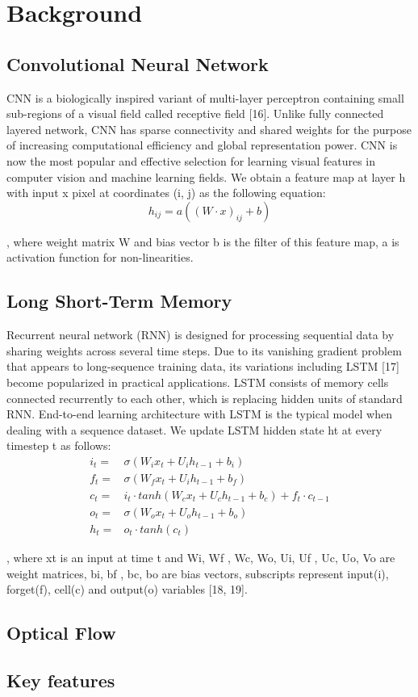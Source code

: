 \section{Background}
\subsection{Convolutional Neural Network}
CNN is a biologically inspired variant of multi-layer perceptron containing small sub-regions of a visual field called receptive field [16]. 
Unlike fully connected layered network, CNN has sparse connectivity and shared weights for the purpose
of increasing computational efficiency and global representation power. CNN is now the most popular and effective selection for learning visual features in computer vision and machine learning fields. We obtain a feature map at layer h with input x pixel at coordinates (i, j) as the following equation:
\begin{equation}
h_{ij} = a((W \cdot x)_{ij}+b)
\end{equation}

, where weight matrix W and bias vector b is the filter of this feature map, a is activation function for non-linearities.
    
\subsection{Long Short-Term Memory}
Recurrent neural network (RNN) is designed for processing sequential data by sharing weights across several time steps. 
Due to its vanishing gradient problem that appears to long-sequence training data, its variations including LSTM [17] become popularized in practical applications. 
LSTM consists of memory cells connected recurrently to each other, which is replacing hidden units of standard RNN. 
End-to-end learning architecture with LSTM is the typical model when dealing with a sequence dataset. We update LSTM hidden state ht at every timestep t as follows:
\begin{equation}
\begin{split}
i_t =& \sigma (W_i x_t + U_i h_{t-1} + b_i)\\
f_t =& \sigma (W_f x_t + U_i h_{t-1} + b_f)\\
c_t =& i_t \cdot tanh(W_c x_t + U_c h_{t-1} + b_c) + f_t \cdot c_{t-1}\\
o_t =& \sigma (W_o x_t + U_o h_{t-1} + b_o)\\
h_t =& o_t \cdot tanh(c_t)
\end{split}
\end{equation}

, where xt is an input at time t and Wi, Wf , Wc, Wo, Ui, Uf , Uc, Uo, Vo are weight matrices, bi, bf , bc, bo are bias vectors, subscripts represent input(i), forget(f), cell(c) and output(o) variables [18, 19].
\subsection{Optical Flow}
\subsection{Key features}
